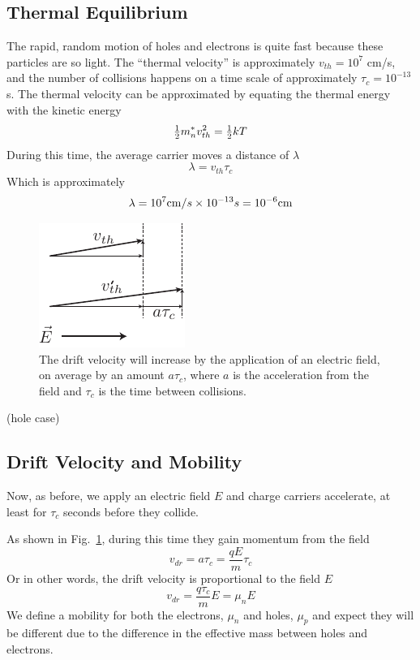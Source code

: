 \subsection{Thermal Equilibrium}


The rapid, random motion of holes and electrons is quite fast because these particles are so light.  The “thermal velocity” is approximately $v_{th} = 10^7$ cm/s, and the number of collisions happens on a time scale of approximately $\tau_c = 10^{-13}$s.  The thermal velocity can be approximated by equating the thermal energy with the kinetic energy
\begin{equation}
        {\textstyle{1 \over 2}}m_n^*v_{th}^2 = {\textstyle{1 \over 2}}kT
\end{equation}
During this time, the average carrier moves a distance of $\lambda$
\begin{equation} \lambda  = {v_{th}}{\tau _c}\end{equation}
Which is approximately
\begin{equation}
        \lambda  = {10^7}{\rm{cm}}/s \times {10^{ - 13}}s = {10^{ - 6}}{\rm{cm}}
\end{equation}


\begin{figure}[tb]
\begin{center}
\includegraphics[width=.3\columnwidth]{drift_field}
\end{center}
\caption{The drift velocity will increase by the application of an electric field, on average by an amount $a \tau_c$, where $a$ is the acceleration from the field and $\tau_c$ is the time between collisions. } \label{fig:drift_field}
\end{figure}
(hole case)




\subsection{Drift Velocity and Mobility}
Now, as before, we apply an electric field $E$ and charge carriers accelerate, at least for  $\tau_c$ seconds before they collide.


As shown in Fig.~\ref{fig:drift_field}, during this time they gain momentum from the field
\begin{equation}
        v_{dr} = a \tau_c = \frac{q E}{m} \tau_c
\end{equation}
Or in other words, the drift velocity is proportional to the field $E$
\begin{equation}
        v_{dr} = \frac{q \tau_c}{m} E = \mu_n E
\end{equation}
We define a mobility for both the electrons, $\mu_n$ and holes, $\mu_p$ and expect they will be different due to the difference in the effective mass between holes and electrons.







